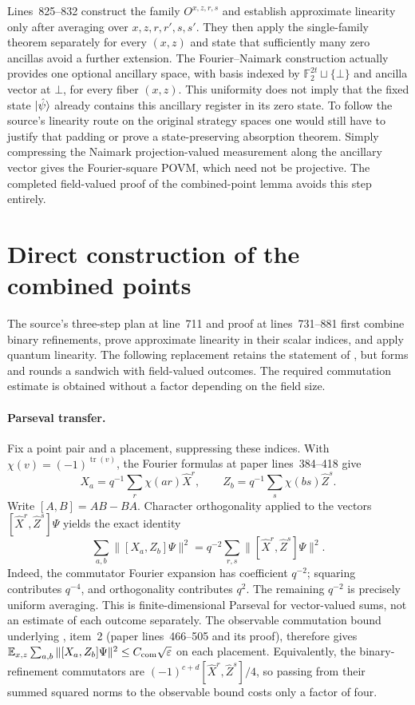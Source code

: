 \documentclass[11pt]{article}
\begin{document}
Lines~825--832 construct the family $O^{x,z,r,s}$ and establish approximate
linearity only after averaging over $x,z,r,r',s,s'$. They then apply the
single-family theorem separately for every $(x,z)$ and state that sufficiently
many zero ancillas avoid a further extension. The Fourier--Naimark construction
actually provides one optional ancillary space, with basis indexed by
$\mathbb F_2^{2t}\sqcup\{\bot\}$ and ancilla vector at $\bot$, for every
fiber $(x,z)$. This uniformity does not imply that the fixed state
$\ket{\hat\psi}$ already contains this ancillary register in its zero state.
To follow the source's linearity route on the original strategy spaces one
would still have to justify that padding or prove a state-preserving
absorption theorem. Simply compressing the Naimark projection-valued
measurement along the ancillary vector gives the Fourier-square POVM, which
need not be projective. The completed field-valued proof of the combined-point
lemma avoids this step entirely.

\section{Direct construction of the combined points}
\label{sec:direct-combined-points}

The source's three-step plan at line~711 and proof at lines~731--881 first
combine binary refinements, prove approximate linearity in their scalar
indices, and apply quantum linearity.  The following replacement retains the
statement of , but forms and rounds a sandwich with
field-valued outcomes.  The required commutation estimate is obtained without
a factor depending on the field size.

\paragraph{Parseval transfer.}
Fix a point pair and a placement, suppressing these indices.  With
$\chi(v)=(-1)^{\operatorname{tr}(v)}$, the Fourier formulas at paper
lines~384--418 give
\[
 X_a=q^{-1}\sum_r\chi(ar)\widehat X^r,\qquad
 Z_b=q^{-1}\sum_s\chi(bs)\widehat Z^s.
\]
Write $[A,B]=AB-BA$.  Character orthogonality applied to the vectors
$[\widehat X^r,\widehat Z^s]\Psi$ yields the exact identity
\[
 \sum_{a,b}\|[X_a,Z_b]\Psi\|^2
 =q^{-2}\sum_{r,s}\|[\widehat X^r,\widehat Z^s]\Psi\|^2.
\]
Indeed, the commutator Fourier expansion has coefficient $q^{-2}$; squaring
contributes $q^{-4}$, and orthogonality contributes $q^2$.  The remaining
$q^{-2}$ is precisely uniform averaging.  This is finite-dimensional Parseval
for vector-valued sums, not an estimate of each outcome separately.  The
observable commutation bound underlying , item~2
(paper lines~466--505 and its proof), therefore gives
$\mathbb E_{x,z}\sum_{a,b}\|[X_a,Z_b]\Psi\|^2\leq C_{\rm com}\sqrt\varepsilon$
on each placement.  Equivalently, the binary-refinement commutators are
$(-1)^{c+d}[\widehat X^r,\widehat Z^s]/4$, so passing from their summed
squared norms to the observable bound costs only a factor of four.
\end{document}
